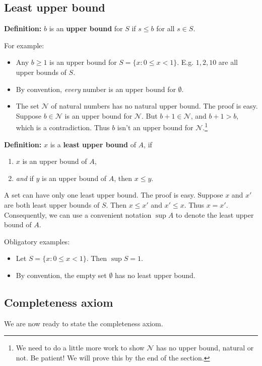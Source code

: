 \subsection{Least upper bound}
\textbf{Definition:} $b$ is an \textbf{upper bound} for $S$ if
$s\leq b$ for all $s\in S$.

\vs

For example:
\begin{itemize}
\item Any $b\geq1$ is an upper bound for $S=\{x:0\leq x<1\}$. E.g. $1, 2,
  10$ are all upper bounds of $S$.
\item By convention, \textit{every} number is an upper bound for $\emptyset$.
\item The set $\mathcal{N}$ of natural numbers has no natural upper bound. The
  proof is easy. Suppose $b\in\mathcal{N}$ is an upper bound for
  $\mathcal{N}$. But $b+1\in\mathcal{N}$, and $b+1>b$, which is a contradiction. Thus
  $b$ isn't an upper bound for $\mathcal{N}$.\footnote{We need to do a little
    more work to show $\mathcal{N}$ has no upper bound, natural or not. Be
    patient! We will prove this by the end of the section.}
\end{itemize}

\vs

\textbf{Definition:} $x$ is a \textbf{least upper bound} of $A$, if
\begin{enumerate}
\item $x$ is an upper bound of $A$,
\item \textit{and} if $y$ is an upper bound of $A$, then $x\leq y$.
\end{enumerate}

A set can have only one least upper bound. The proof is easy. Suppose
$x$ and $x'$ are both least upper bounds of $S$. Then $x\leq x'$ and
$x'\leq x$. Thus $x=x'$. Consequently, we can use a convenient notation
$\sup A$ to denote the least upper bound of $A$.

\vs

Obligatory examples:
\begin{itemize}
\item Let $S=\{x:0\leq x<1\}$. Then $\sup S=1$.
\item By convention, the empty set $\emptyset$ has no least upper bound.
\end{itemize}

\subsection{Completeness axiom}
We are now ready to state the completeness axiom.

